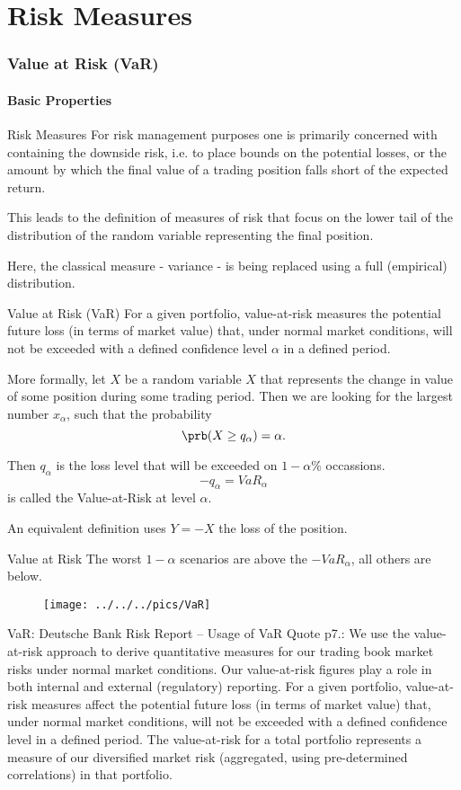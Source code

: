 \part{Risk Measures}
\section{Value at Risk (VaR)}


\subsection{Basic Properties}

Risk Measures
	For risk management purposes one is primarily concerned with
	containing the downside risk, i.e. to place bounds on the
	potential losses, or the amount by which the final value of a
	trading position falls short of the expected return.
 
	This leads to the definition of measures of risk that focus on the lower tail of
	the distribution of the random variable representing the final position.
 
	Here, the classical measure - variance - is being replaced using a
	full (empirical) distribution.


Value at Risk (VaR)
	For a given portfolio, value-at-risk measures the potential future loss (in
	terms of market value) that, under normal market conditions, will not be exceeded with a defined confidence
	level $\alpha$ in a defined period.

	More formally, let $X$ be a random variable $X$ that represents the change in value of some position 
	during some trading period. Then we are looking for the largest number  $x_{\alpha}$, such that the probability 
		$$
		\prb(X \geq q_{\alpha})= \alpha.
		$$
 
	Then $q_{\alpha}$ is the loss level that will be exceeded on $1-\alpha \%$ occassions. 
		$$
		-q_\alpha= VaR_\alpha
		$$ 
		is called the Value-at-Risk at level $\alpha$.
 
	An equivalent definition uses $Y=-X$ the loss of the position. 


Value at Risk
	The worst $1-\alpha$ scenarios are above the $-VaR_\alpha$, all others are below.
	\begin{figure}
		\centering
			\texttt{[image: ../../../pics/VaR]}
		\label{fig:VaR}
	\end{figure}
	

VaR: Deutsche Bank Risk Report -- Usage of VaR
Quote p7.: We use the value-at-risk approach to derive quantitative measures for our trading book
market risks under normal market conditions. Our value-at-risk figures play a role in both internal and
external (regulatory) reporting. For a given portfolio, value-at-risk measures affect the potential future loss (in
terms of market value) that, under normal market conditions, will not be exceeded with a defined confidence
level in a defined period. The value-at-risk for a total portfolio represents a measure of our diversified
market risk (aggregated, using pre-determined correlations) in that portfolio.


